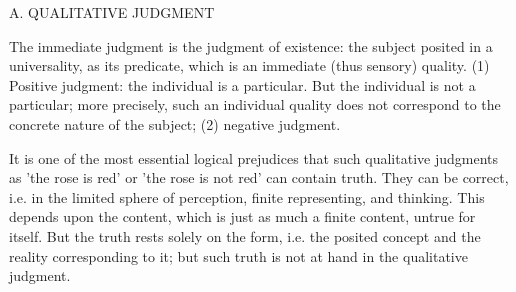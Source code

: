 A. QUALITATIVE JUDGMENT

The immediate judgment is the judgment of existence:
the subject posited in a universality, as its predicate,
which is an immediate (thus sensory) quality.
(1) Positive judgment: the individual is a particular.
But the individual is not a particular;
more precisely, such an individual quality
does not correspond to the concrete nature of the subject;
(2) negative judgment.

    It is one of the most essential logical prejudices that such qualitative
    judgments as 'the rose is red' or 'the rose is not red' can contain truth.
    They can be correct, i.e. in the limited sphere of perception,
    finite representing, and thinking. This depends upon the content,
    which is just as much a finite content, untrue for itself.
    But the truth rests solely on the form, i.e. the posited concept and
    the reality corresponding to it; but such truth is not at hand
    in the qualitative judgment.

